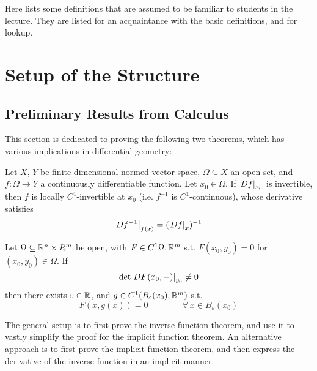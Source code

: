 \documentclass{article}
\begin{document}

\tableofcontents
\newpage

\def\open{\mathcal{O}}

Here lists some definitions that are assumed to be familiar to students in the lecture. They are listed for an acquaintance with the basic definitions, and for lookup.

\section{Setup of the Structure}

\subsection{Preliminary Results from Calculus}

This section is dedicated to proving the following two theorems, which has various implications in differential geometry:

\begin{theorem}\label{thm: inverse function theorem}
    Let $X$, $Y$ be finite-dimensional normed vector space, $\Omega \subseteq X$ an open set, and $f: \Omega \to Y$ a continuously differentiable function. Let $x_0 \in \Omega$. If $\left.Df\right|_{x_0}$ is invertible, then $f$ is locally $C^{1}$-invertible at $x_0$ (i.e. $f^{-1}$ is $C^1$-continuous), whose derivative satisfies
    \[
        \left.Df^{-1}\right|_{f(x)} = (\left.Df\right|_{x})^{-1}
    \]
\end{theorem}
\vspace{1em}

\begin{theorem}\label{thm: implicit function theorem}
    Let $\Omega \subseteq \mathbb{R}^n \times R^m$ be open, with $F \in C^1{\Omega, \mathbb{R}^m}$ s.t. $F(x_0, y_0) = 0$ for $(x_0, y_0) \in \Omega$. If
    \[
        \det \left.DF(x_0, -)\right|_{y_0} \neq 0
    \]
    then there exists $\varepsilon \in \mathbb{R}$, and $g \in C^1(B_{\varepsilon}(x_0), \mathbb{R}^m)$ s.t.
    \[
        F(x, g(x)) = 0 \qquad \qquad \forall \ x \in B_{\varepsilon}(x_0)
    \]
\end{theorem}

The general setup is to first prove the inverse function theorem, and use it to vastly simplify the proof for the implicit function theorem. An alternative approach is to first prove the implicit function theorem, and then express the derivative of the inverse function in an implicit manner. 
\end{document}
